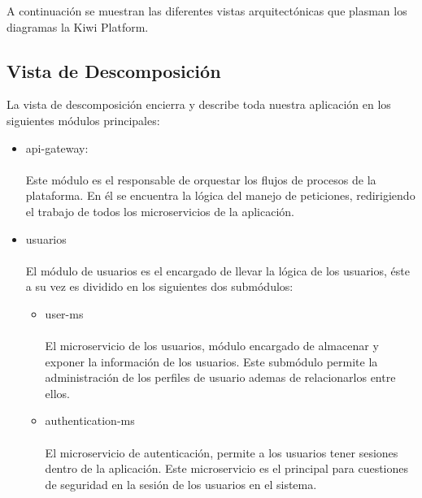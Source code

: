 A continuación se muestran las diferentes vistas arquitectónicas que plasman los diagramas la Kiwi Platform.

\subsection{Vista de Descomposición}
La vista de descomposición encierra y describe toda nuestra aplicación en los siguientes módulos principales:
\begin{itemize}
    \item api-gateway:\\\\
    Este módulo es el responsable de orquestar los flujos de procesos de la plataforma. En él se encuentra la lógica del manejo de peticiones, redirigiendo el trabajo de todos los microservicios de la aplicación.
    
    \item usuarios\\\\
    El módulo de usuarios es el encargado de llevar la lógica de los usuarios, éste a su vez es dividido en los siguientes dos submódulos:
    \begin{itemize}
        \item user-ms \\\\
        El microservicio de los usuarios, módulo encargado de almacenar y exponer la información de los usuarios. Este submódulo permite la administración de los perfiles de usuario ademas de relacionarlos entre ellos.
        \item authentication-ms \\\\
        El microservicio de autenticación, permite a los usuarios tener sesiones dentro de la aplicación. Este microservicio es el principal para cuestiones de seguridad en la sesión de los usuarios en el sistema.
    \end{itemize}
    

\end{itemize}
